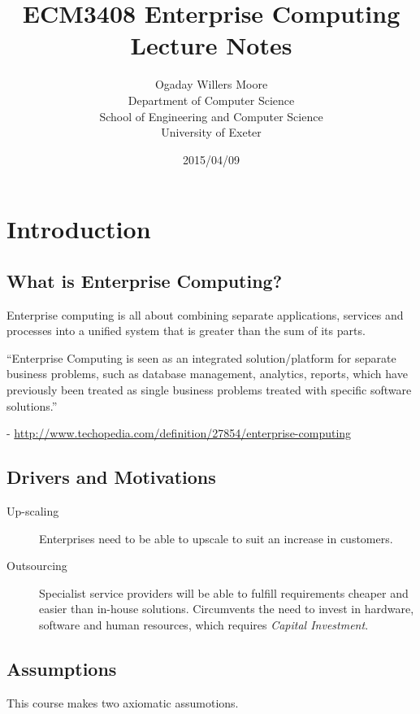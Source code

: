 \documentclass[11pt]{article}
\title{ECM3408 Enterprise Computing Lecture Notes}
\author{Ogaday Willers Moore\\        %
Department of Computer Science\\
School of Engineering and Computer Science\\
University of Exeter}
\date{2015/04/09}
\begin{document}
\maketitle

\tableofcontents

\pagebreak

\section{Introduction}
\label{sec:intro}

\subsection{What is Enterprise Computing?}
\label{sec:1.1}
Enterprise computing is all about combining separate applications, services and processes into a unified system that is greater than the sum of its parts.
\begin{displayquote}
``Enterprise Computing is seen as an integrated solution/platform for separate business problems, such as database management, analytics, reports, which have previously been treated as single business problems treated with specific software solutions.''
\end{displayquote}

- \url{http://www.techopedia.com/definition/27854/enterprise-computing}

\subsection{Drivers and Motivations}
\label{sec:1.2}

\begin{description}
\item[Up-scaling] Enterprises need to be able to upscale to suit an increase in customers.
\item[Outsourcing] Specialist service providers will be able to fulfill requirements cheaper and easier than in-house solutions. Circumvents the need to invest in hardware, software and human resources, which requires \textit{Capital Investment}.
\end{description}

\subsection{Assumptions}

This course makes two axiomatic assumotions.
\end{document}

